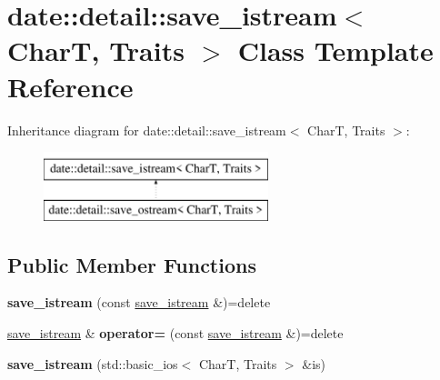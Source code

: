 \hypertarget{classdate_1_1detail_1_1save__istream}{}\section{date\+::detail\+::save\+\_\+istream$<$ CharT, Traits $>$ Class Template Reference}
\label{classdate_1_1detail_1_1save__istream}
Inheritance diagram for date\+::detail\+::save\+\_\+istream$<$ CharT, Traits $>$\+:\begin{figure}[H]
\begin{center}
\leavevmode
\includegraphics[height=2.000000cm]{classdate_1_1detail_1_1save__istream}
\end{center}
\end{figure}
\subsection*{Public Member Functions}
\begin{DoxyCompactItemize}
\item 
\mbox{\label{classdate_1_1detail_1_1save__istream_a67d2664f0a2adceb71c34e0843b85e56}} 
{\bfseries save\+\_\+istream} (const \mbox{\hyperlink{classdate_1_1detail_1_1save__istream}{save\+\_\+istream}} \&)=delete
\item 
\mbox{\label{classdate_1_1detail_1_1save__istream_abfa8826e405a978eed353888c891f5dd}} 
\mbox{\hyperlink{classdate_1_1detail_1_1save__istream}{save\+\_\+istream}} \& {\bfseries operator=} (const \mbox{\hyperlink{classdate_1_1detail_1_1save__istream}{save\+\_\+istream}} \&)=delete
\item 
\mbox{\label{classdate_1_1detail_1_1save__istream_a05300943719140ccd38492ecd384a087}} 
{\bfseries save\+\_\+istream} (std\+::basic\+\_\+ios$<$ CharT, Traits $>$ \&is)
\end{DoxyCompactItemize}

